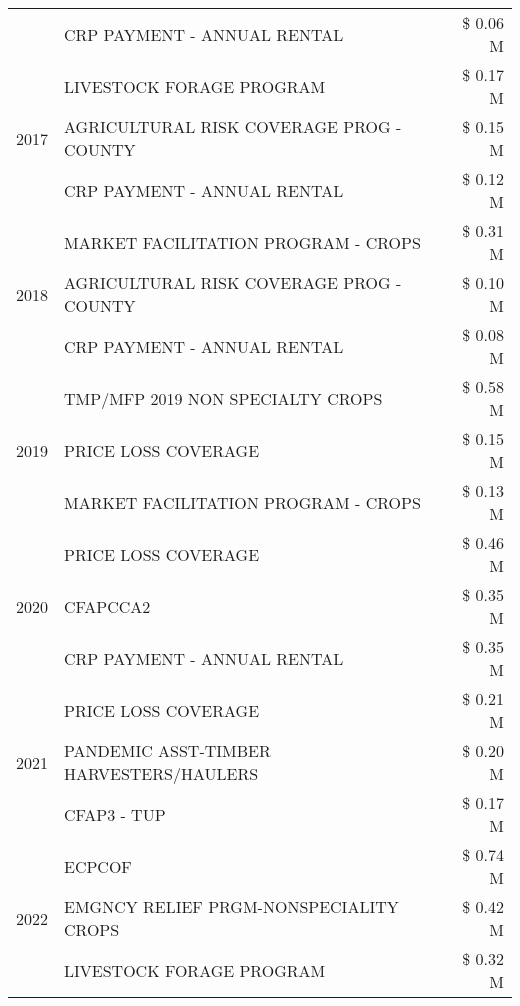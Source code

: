 \begin{tabular}{llr}
 & CRP PAYMENT - ANNUAL RENTAL & \$ 0.06 M \\
\cline{1-3}
\multirow[t]{3}{*}{2017} & LIVESTOCK FORAGE PROGRAM & \$ 0.17 M \\
 & AGRICULTURAL RISK COVERAGE PROG - COUNTY & \$ 0.15 M \\
 & CRP PAYMENT - ANNUAL RENTAL & \$ 0.12 M \\
\cline{1-3}
\multirow[t]{3}{*}{2018} & MARKET FACILITATION PROGRAM - CROPS & \$ 0.31 M \\
 & AGRICULTURAL RISK COVERAGE PROG - COUNTY & \$ 0.10 M \\
 & CRP PAYMENT - ANNUAL RENTAL & \$ 0.08 M \\
\cline{1-3}
\multirow[t]{3}{*}{2019} & TMP/MFP 2019 NON SPECIALTY CROPS & \$ 0.58 M \\
 & PRICE LOSS COVERAGE & \$ 0.15 M \\
 & MARKET FACILITATION PROGRAM - CROPS & \$ 0.13 M \\
\cline{1-3}
\multirow[t]{3}{*}{2020} & PRICE LOSS COVERAGE & \$ 0.46 M \\
 & CFAPCCA2 & \$ 0.35 M \\
 & CRP PAYMENT - ANNUAL RENTAL & \$ 0.35 M \\
\cline{1-3}
\multirow[t]{3}{*}{2021} & PRICE LOSS COVERAGE & \$ 0.21 M \\
 & PANDEMIC ASST-TIMBER HARVESTERS/HAULERS & \$ 0.20 M \\
 & CFAP3 - TUP & \$ 0.17 M \\
\cline{1-3}
\multirow[t]{3}{*}{2022} & ECPCOF & \$ 0.74 M \\
 & EMGNCY RELIEF PRGM-NONSPECIALITY CROPS & \$ 0.42 M \\
 & LIVESTOCK FORAGE PROGRAM & \$ 0.32 M \\
\cline{1-3}
\bottomrule
\end{tabular}
